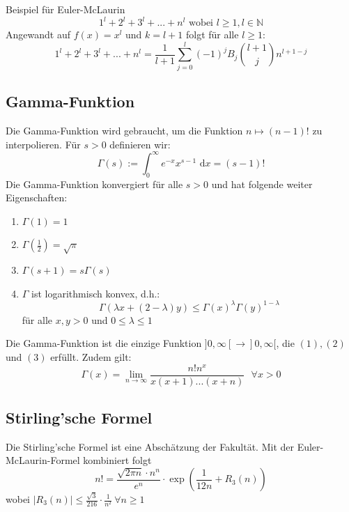 \documentclass[a4paper,10pt]{article}
\def\limn{\lim_{n\to \infty}}
\def\dx{\text{ d}x}
\begin{document}
\begin{subbox}{Beispiel für Euler-McLaurin}
  $$1^l + 2^l + 3^l + ... + n^l \text{ wobei } l \geq 1, l \in \mathbb{N}$$
  Angewandt auf $f(x) = x^l$ und $k = l + 1$ folgt für alle $l \geq 1$:
  $$1^l + 2^l + 3^l + ... + n^l = \frac{1}{l + 1} \sum_{j = 0}^l (-1)^j B_j {l + 1 \choose j} n^{l+1-j}$$
\end{subbox}

\subsection{Gamma-Funktion}
Die Gamma-Funktion wird gebraucht, um die Funktion $n \mapsto (n-1)!$ zu interpolieren. Für $s > 0$ definieren wir: $$\Gamma(s) := \int_0^\infty e^{-x}x^{s-1}\dx = (s-1)!$$
Die Gamma-Funktion konvergiert für alle $s > 0$ und hat folgende weiter Eigenschaften:
\begin{enumerate}
  \item $\Gamma(1) = 1$
  \item $\Gamma(\frac{1}{2}) = \sqrt{\pi}$
  \item $\Gamma(s + 1) = s \Gamma(s)$
  \item $\Gamma$ ist logarithmisch konvex, d.h.: $$\Gamma(\lambda x + (2 - \lambda)y) \leq \Gamma(x)^\lambda \Gamma(y)^{1 - \lambda}$$ für alle $x, y > 0$ und $0 \leq \lambda \leq 1$
\end{enumerate}
Die Gamma-Funktion ist die einzige Funktion $]0, \infty[ \to ]0, \infty[$, die $(1), (2)$ und $(3)$ erfüllt. Zudem gilt: $$\Gamma(x) = \limn \frac{n!n^x}{x(x+1)...(x+n)} \ \ \ \forall x > 0$$

\subsection{Stirling'sche Formel}
Die Stirling'sche Formel ist eine Abschätzung der Fakultät. Mit der Euler-McLaurin-Formel kombiniert folgt
$$n! = \frac{\sqrt{2\pi n} \cdot n^n}{e^n} \cdot \exp(\frac{1}{12n}+R_3(n))$$
wobei $|R_3(n)| \le \frac{\sqrt{3}}{216}\cdot\frac{1}{n^2} \ \forall n \ge 1$
\end{document}
